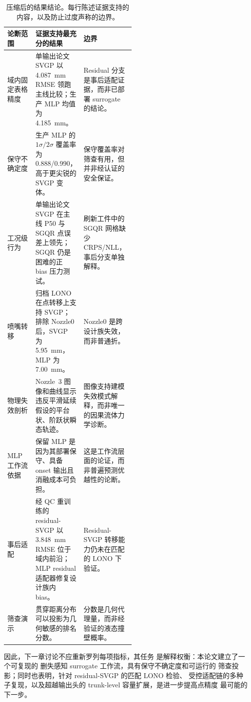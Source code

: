 \begin{table}[t]
\centering
\scriptsize
\setlength{\tabcolsep}{4pt}
\begin{tabularx}{\linewidth}{@{}L{0.22\linewidth}L{0.30\linewidth}Y@{}}
\toprule
论断范围 & 证据支持最充分的结果 & 边界 \\
\midrule
域内固定表格精度 & 单输出论文 SVGP 以 \SI{4.087}{mm} RMSE 领跑主线比较；生产 MLP 均值为 \SI{4.185}{mm}。 & Residual 分支是事后适配证据，而非已部署 surrogate 的结论。 \\
保守不确定度 & 生产 MLP 的 \(1\sigma/2\sigma\) 覆盖率为 0.888/0.990，高于更尖锐的 SVGP 变体。 & 保守覆盖率对筛查有用，但并非经认证的安全保证。 \\
工况级行为 & 单输出论文 SVGP 在主线 P50 与 SGQR 点误差上领先；SGQR 仍是困难的正 bias 压力测试。 & 刷新工件中的 SGQR 网格缺少 CRPS/NLL，事后分支单独解释。 \\
喷嘴转移 & 归档 LONO 在点转移上支持 SVGP；排除 Nozzle0 后，SVGP 为 \SI{5.95}{mm}，MLP 为 \SI{7.00}{mm}。 & Nozzle0 是跨设计族失效，而非普通折。 \\
物理失效剖析 & Nozzle~3 图像和曲线显示违反平滑延续假设的平台状、阶跃状瞬态轨迹。 & 图像支持建模失效模式解释，而非唯一的因果流体力学诊断。 \\
MLP 工作流依据 & 保留 MLP 是因为其部署保守、具备 onset 输出且消融成本可负担。 & 这是工作流层面的论证，而非普遍预测优越性的论断。 \\
事后适配 & 经 QC 重训练的 residual-SVGP 以 \SI{3.848}{mm} RMSE 位于域内前沿；MLP residual 适配器修复设计族内 bias。 & Residual-SVGP 转移能力仍未在匹配的 LONO 下验证。 \\
筛查演示 & 贯穿距离分布可以投影为几何敏感的排名分数。 & 分数是几何代理量，而非经验证的液态撞壁概率。 \\
\bottomrule
\end{tabularx}
\caption{压缩后的结果结论。每行陈述证据支持的内容，以及防止过度声称的边界。}
\label{tab:chapter-verdict-rewrite}
\end{table}

因此，下一章讨论不应重新罗列每项指标，其任务
是解释权衡：本论文建立了一个可复现的
删失感知 surrogate 工作流，具有保守不确定度和可运行的
筛查投影；同时也表明，针对 residual-SVGP 的匹配 LONO 检验、
受控适配链的多种子复现，以及超越输出头的 trunk-level
容量扩展，是进一步提高点精度
最可能的下一步。
